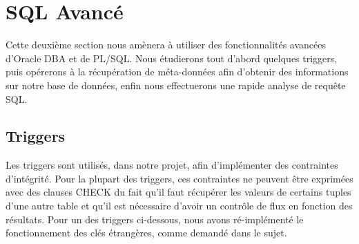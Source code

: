 \documentclass[12pt,a4paper]{article}
\begin{document}
\section{SQL Avancé}
\label{sec.reference}

Cette deuxième section nous amènera à utiliser des fonctionnalités avancées
d’Oracle DBA et de PL/SQL. Nous étudierons tout d’abord quelques triggers, puis
opérerons à la récupération de méta-données afin d’obtenir des informations sur
notre base de données, enfin nous effectuerons une rapide analyse de requête
SQL.

\subsection{Triggers}
\label{sub.trig}

Les triggers sont utilisés, dans notre projet, afin d'implémenter des
contraintes d'intégrité. Pour la plupart des triggers, ces contraintes ne
peuvent être exprimées avec des clauses CHECK du fait qu’il faut  récupérer les
valeurs de certains tuples d’une autre table et qu’il est nécessaire d’avoir un
contrôle de flux en fonction des résultats. Pour un des triggers ci-dessous,
nous avons ré-implémenté le fonctionnement des clés étrangères, comme demandé
dans le sujet.
\end{document}
